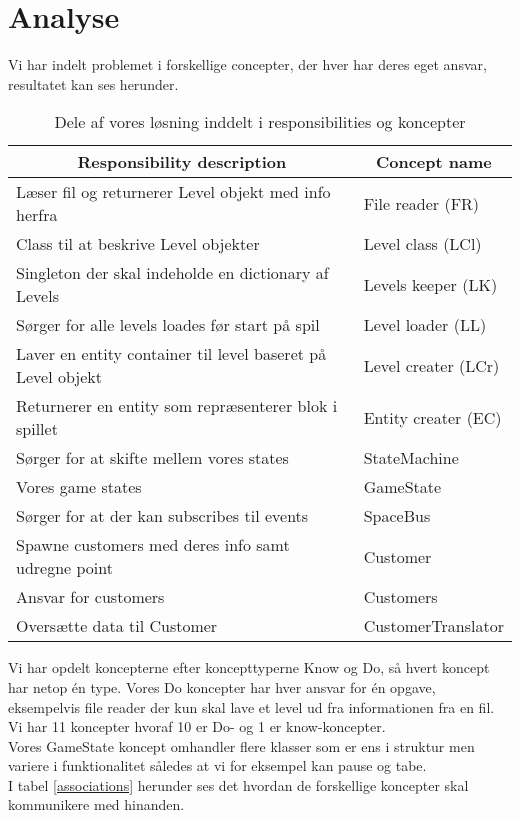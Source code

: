 \section{Analyse}
Vi har indelt problemet i forskellige concepter, der hver har deres eget ansvar, resultatet kan ses herunder.\\
\begin{table}[!h]
\centering
\begin{tabular}{|l|l|}
\hline
\multicolumn{1}{|c|}{\textbf{Responsibility description}}            & \multicolumn{1}{c|}{\textbf{Concept name}} \\ \hline
Læser fil og returnerer Level objekt med info herfra        & File reader (FR)                       \\ \hline
Class til at beskrive Level objekter                        & Level class (LCl)                       \\ \hline
Singleton der skal indeholde en dictionary af Levels        & Levels keeper (LK)                    \\ \hline
Sørger for alle levels loades før start på spil             & Level loader (LL)                     \\ \hline
Laver en entity container til level baseret på Level objekt & Level creater (LCr)                     \\ \hline
Returnerer en entity som repræsenterer blok i spillet       & Entity creater (EC)                    \\ \hline
Sørger for at skifte mellem vores states & StateMachine \\ \hline
Vores game states & GameState\\ \hline
Sørger for at der kan subscribes til events & SpaceBus\\ \hline
Spawne customers med deres info samt udregne point  & Customer \\ \hline  
Ansvar for customers & Customers\\ \hline
Oversætte data til Customer & CustomerTranslator\\
\hline
\end{tabular}
\caption{Dele af vores løsning inddelt i responsibilities og koncepter}
\label{responsibilities}
\end{table}

\newpage

Vi har opdelt koncepterne efter koncepttyperne Know og Do, så hvert koncept har netop én type. Vores Do koncepter har hver ansvar for én opgave, eksempelvis file reader der kun skal lave et level ud fra informationen fra en fil. Vi har 11 koncepter hvoraf 10 er Do- og 1 er know-koncepter.\\
Vores GameState koncept omhandler flere klasser som er ens i struktur men variere i funktionalitet således at vi for eksempel kan pause og tabe.\\
I tabel \ref{associations} herunder ses det hvordan de forskellige koncepter skal kommunikere med hinanden.

